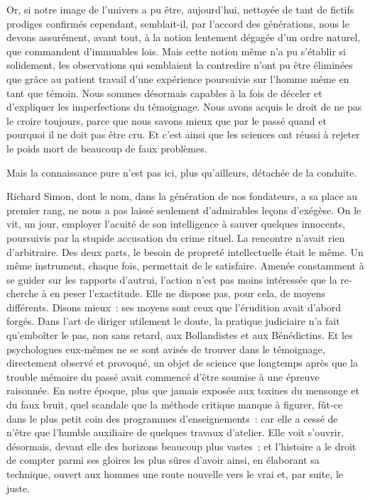 \documentclass[french,twoside]{book} %
\begin{document}
Or, si notre image de l’univers a pu être, aujourd’hui, nettoyée de tant de fictifs prodiges confirmés cependant, semblait‑il, par l’accord des générations, nous le devons assurément, avant tout, à la notion lentement dégagée d’un ordre naturel, que commandent d’immuables lois. Mais cette notion même n’a pu s’établir si solidement, les observations qui semblaient la contredire n’ont pu être éliminées que grâce au patient travail d’une expérience poursuivie sur l’homme même en tant que témoin. Nous sommes désormais capables à la fois de déceler et d’expliquer les imperfections du témoignage. Nous avons acquis le droit de ne pas le croire toujours, parce que nous savons mieux que par le passé quand et pourquoi il ne doit pas être cru. Et c’est ainsi que les sciences ont réussi à rejeter le poids mort de beaucoup de faux problèmes.\par
Mais la connaissance pure n’est pas ici, plus qu’ailleurs, détachée de la conduite.\par
Richard Simon, dont le nom, dans la génération de nos fondateurs, a sa place au premier rang, ne nous a pas laissé seulement d’admirables leçons d’exégèse. On le vit, un jour, employer l’acuité de son intelligence à sauver quelques innocents, poursuivis par la stupide accusation du crime rituel. La rencontre n’avait rien d’arbitraire. Des deux parts, le besoin de propreté intellectuelle était le même. Un même instrument, chaque fois, permettait de le satisfaire. Amenée constamment à se guider sur les rapports d’autrui, l’action n’est pas moins intéressée que la re­cherche à en peser l’exactitude. Elle ne dispose pas, pour cela, de moyens différents. Disons mieux : ses moyens sont ceux que l’érudition avait d’abord forgés. Dans l’art de diriger utilement le doute, la pratique judi­ciaire n’a fait qu’emboîter le pas, non sans retard, aux Bollandistes et aux Bénédictins. Et les psychologues eux-mêmes ne se sont avisés de trouver dans le témoignage, directement observé et provoqué, un objet de science que longtemps après que la trouble mémoire du passé avait commencé d’être soumise à une épreuve raisonnée. En notre époque, plus  
\label{p67} que jamais exposée aux toxines du mensonge et du faux bruit, quel scan­dale que la méthode critique manque à figurer, fût‑ce dans le plus petit coin des programmes d’enseignements : car elle a cessé de n’être que l’humble auxiliaire de quelques travaux d’atelier. Elle voit s’ouvrir, désormais, devant elle des horizons beaucoup plus vastes ; et l’histoire a le droit de compter parmi ses gloires les plus sûres d’avoir ainsi, en éla­borant sa technique, ouvert aux hommes une route nouvelle vers le vrai et, par suite, le juste.
\end{document}
